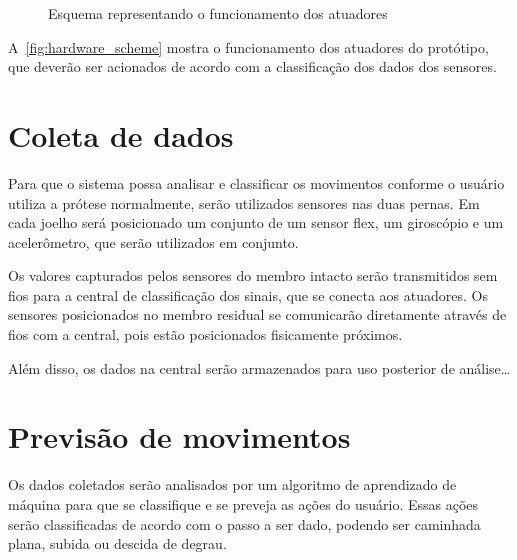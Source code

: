 \begin{figure}[h]
	\caption{\label{fig:hardware_scheme}Esquema representando o funcionamento dos atuadores}
	\begin{center}
	\end{center}
\end{figure}

A~\autoref{fig:hardware_scheme} mostra o funcionamento dos atuadores do protótipo, que deverão ser acionados de acordo com a classificação dos dados dos sensores. 



\section{Coleta de dados}
Para que o sistema possa analisar e classificar os movimentos conforme o usuário utiliza a prótese normalmente, serão utilizados sensores nas duas pernas. Em cada joelho será posicionado um conjunto de um sensor flex, um giroscópio e um acelerômetro, que serão utilizados em conjunto.

Os valores capturados pelos sensores do membro intacto serão transmitidos sem fios para a central de classificação dos sinais, que se conecta aos atuadores. Os sensores posicionados no membro residual se comunicarão diretamente através de fios com a central, pois estão posicionados fisicamente próximos.

Além disso, os dados na central serão armazenados para uso posterior de análise\ldots {}

\section{Previsão de movimentos}
Os dados coletados serão analisados por um algoritmo de aprendizado de máquina para que se classifique e se preveja as ações do usuário. Essas ações serão classificadas de acordo com o passo a ser dado, podendo ser caminhada plana, subida ou descida de degrau.

